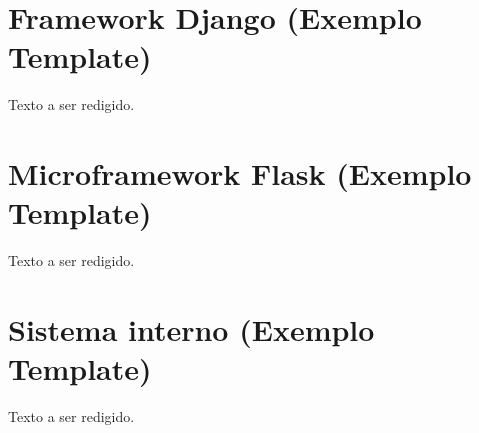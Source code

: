 \section{Framework Django (Exemplo Template)}

Texto a ser redigido.

\section{Microframework Flask (Exemplo Template)}

Texto a ser redigido.

\section{Sistema interno (Exemplo Template)}

Texto a ser redigido.